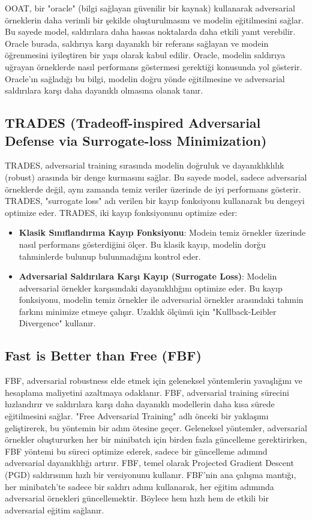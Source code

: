 OOAT, bir "oracle" (bilgi sağlayan güvenilir bir kaynak) kullanarak adversarial örneklerin daha verimli bir şekilde oluşturulmasını ve modelin eğitilmesini sağlar. Bu sayede model, saldırılara daha hassas noktalarda daha etkili yanıt verebilir. Oracle burada, saldırıya karşı dayanıklı bir referans sağlayan ve modein öğrenmesini iyileştiren bir yapı olarak kabul edilir. Oracle, modelin saldırıya uğrayan örneklerde nasıl performans göstermesi gerektiği konusunda yol gösterir. Oracle'ın sağladığı bu bilgi, modelin doğru yönde eğitilmesine ve adversarial saldırılara karşı daha dayanıklı olmasına olanak tanır.

\newpage

\subsection{TRADES (Tradeoff-inspired Adversarial Defense via Surrogate-loss Minimization)}

TRADES, adversarial training sırasında modelin doğruluk ve dayanıklıklılık (robust) arasında bir denge kurmasını sağlar. Bu sayede model, sadece adversarial örneklerde değil, aynı zamanda temiz veriler üzerinde de iyi performans gösterir. TRADES, "surrogate loss" adı verilen bir kayıp fonksiyonu kullanarak bu dengeyi optimize eder. TRADES, iki kayıp fonksiyonunu optimize eder:

\begin{itemize}
    \item \textbf{Klasik Sınıflandırma Kayıp Fonksiyonu}: Modein temiz örnekler üzerinde nasıl performans gösterdiğini ölçer. Bu klasik kayıp, modelin dorğu tahminlerde bulunup bulunmadığını kontrol eder.
    \item \textbf{Adversarial Saldırılara Karşı Kayıp (Surrogate Loss)}: Modelin adversarial örnekler karşısındaki dayanıklılığını optimize eder. Bu kayıp fonksiyonu, modelin temiz örnekler ile adversarial örnekler arasındaki tahmin farkını minimize etmeye çalışır. Uzaklık ölçümü için "Kullback-Leibler Divergence" kullanır.
\end{itemize}

\newpage

\subsection{Fast is Better than Free (FBF)}

FBF, adversarial robustness elde etmek için geleneksel yöntemlerin yavaşlığını ve hesaplama maliyetini azaltmaya odaklanır. FBF, adversarial training sürecini hızlandırır ve saldırılara karşı daha dayanıklı modellerin daha kısa sürede eğitilmesini sağlar. "Free Adversarial Training" adlı önceki bir yaklaşımı geliştirerek, bu yöntemin bir adım ötesine geçer. Geleneksel yöntemler, adversarial örnekler oluştururken her bir minibatch için birden fazla güncelleme gerektirirken, FBF yöntemi bu süreci optimize ederek, sadece bir güncelleme adımınd adversarial dayanıklılığı artırır. FBF, temel olarak Projected Gradient Descent (PGD) saldırısının hızlı bir versiyonunu kullanır. FBF'nin ana çalışma mantığı, her minibatch'te sadece bir saldırı adımı kullanarak, her eğitim adımında adversarial örnekleri güncellemektir. Böylece hem hızlı hem de etkili bir adversarial eğitim sağlanır.

